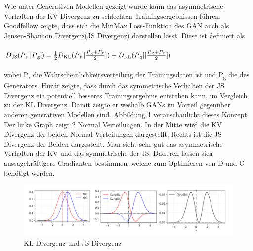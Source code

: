 \documentclass{llncs}
\begin{document}
Wie unter Generativen Modellen gezeigt wurde kann das asymmetrische Verhalten der KV Divergenz zu schlechten Trainingsergebnissen führen. Goodfellow \cite{goodfellow2014} zeigte, dass sich die MinMax Loss-Funktion des GAN auch als Jensen-Shannon Divergenz(JS Divergenz) darstellen lässt. Diese ist definiert als
\\\\
\begin{math} D\textsubscript{JS}(P\textsubscript{r}|| P\textsubscript{g}])=\frac{1}{2}D\textsubscript{KL}(P\textsubscript{r}|| \frac{P\textsubscript{g}+P\textsubscript{r}}{2}])+D\textsubscript{KL}(P\textsubscript{q}|| \frac{P\textsubscript{g}+P\textsubscript{r}}{2}])  
\end{math}
\\\\
wobei P\textsubscript{r} die Wahrscheinlichkeitsverteilung der Trainingsdaten ist und P\textsubscript{g} die des Generators. Huzár \cite{sha} zeigte, dass durch das symmetrische Verhalten der JS Divergenz ein potentiell besseres Trainingsergebnis entstehen kann, im Vergleich zu der KL Divergenz. Damit zeigte er weshalb GANs im Vorteil gegenüber anderen generativen Modellen sind. Abbildung \ref{fig:Bild21} veranschaulicht dieses Konzept. Der linke Graph zeigt 2 Normal Verteilungen. In der Mitte wird die KV Divergenz der beiden Normal Verteilungen dargestellt.  Rechts ist die JS Divergenz der Beiden dargestellt. Man sieht sehr gut das asymmetrische Verhalten der KV und das symmetrische der JS. Dadurch lassen sich aussagekräftigere Gradianten bestimmen, welche zum Optimieren von D und G benötigt werden\cite{sha}. 
 
\begin{figure}
	\centering
	\includegraphics[width=1.0\linewidth]{KLdiv}
	\caption{KL Divergenz und JS Divergenz}
	\label{fig:Bild21}
\end{figure}
\end{document}

